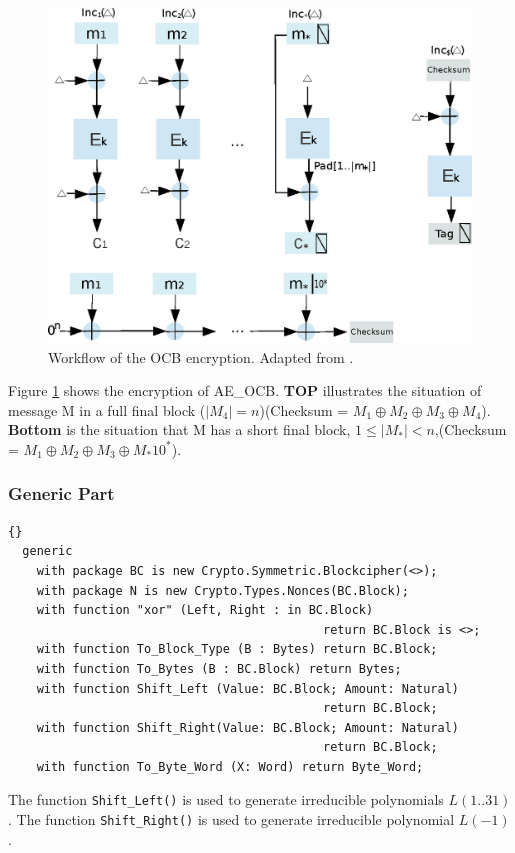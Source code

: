 \begin{figure}[h]
\centering
\includegraphics[scale=0.8]{./images/AE_OCB_En}
\caption{Workflow of the OCB encryption. Adapted from \cite{DBLP:conf/fse/KrovetzR11}.}\label{Workflow_OCB}
\end{figure}
Figure \ref{Workflow_OCB} shows the encryption of
AE\_OCB. \textbf{TOP} illustrates the situation of message M in a full
final block ($|M_4|=n$)(Checksum = $M_1\oplus M_2\oplus M_3\oplus
M_4$). \textbf{Bottom} is the situation that M has a short final
block, $1\leq |M_*|< n$,(Checksum = $M_1\oplus M_2\oplus M_3\oplus
M_*10^*$).

\subsubsection*{Generic Part}
\begin{lstlisting}{}
  generic
    with package BC is new Crypto.Symmetric.Blockcipher(<>);
    with package N is new Crypto.Types.Nonces(BC.Block);
    with function "xor" (Left, Right : in BC.Block)
    										return BC.Block is <>;
    with function To_Block_Type (B : Bytes) return BC.Block;
    with function To_Bytes (B : BC.Block) return Bytes;
    with function Shift_Left (Value: BC.Block; Amount: Natural)
    										return BC.Block;
    with function Shift_Right(Value: BC.Block; Amount: Natural)
    										return BC.Block;
    with function To_Byte_Word (X: Word) return Byte_Word;
\end{lstlisting}
The function \texttt{Shift\_Left()} is used to generate irreducible
polynomials $L(1..31)$. The function \texttt{Shift\_Right()} is used
to generate irreducible polynomial $L(-1)$.

